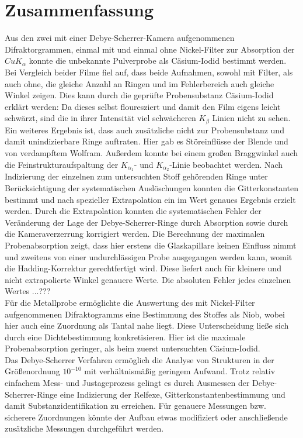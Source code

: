 \documentclass[a4paper,twoside,final]{article}
\begin{document}
\section{Zusammenfassung}
Aus den zwei mit einer Debye-Scherrer-Kamera aufgenommenen Difraktorgrammen, einmal mit und einmal ohne Nickel-Filter zur Absorption der $CuK_{\alpha}$ konnte die unbekannte Pulverprobe als Cäsium-Iodid bestimmt werden. \\
Bei Vergleich beider Filme fiel auf, dass beide Aufnahmen, sowohl mit Filter, als auch ohne, die gleiche Anzahl an Ringen und im Fehlerbereich auch gleiche Winkel zeigen. Dies kann durch die geprüfte Probensubstanz Cäsium-Iodid erklärt werden: Da dieses selbst flouresziert und damit den Film eigens leicht schwärzt, sind die in ihrer Intensität viel schwächeren $K_\beta$ Linien nicht zu sehen. Ein weiteres Ergebnis ist, dass auch zusätzliche nicht zur Probensubstanz und damit unindizierbare Ringe auftraten. Hier gab es Störeinflüsse der Blende und von verdampftem Wolfram. Außerdem konnte bei einem großen Braggwinkel auch die Feinstrukturaufspaltung der $K_{\alpha_1}$- und $K_{\alpha_2}$-Linie beobachtet werden.
Nach Indizierung der einzelnen zum untersuchten Stoff gehörenden Ringe unter Berücksichtigung der systematischen Auslöschungen konnten die Gitterkonstanten bestimmt und nach spezieller Extrapolation ein im Wert genaues Ergebnis erzielt werden. Durch die Extrapolation konnten die systematischen Fehler der Veränderung der Lage der Debye-Scherrer-Ringe durch Absorption sowie durch die Kameraverzerrung korrigiert werden. Die Berechnung der maximalen Probenabsorption zeigt, dass hier erstens die Glaskapillare keinen Einfluss nimmt und zweitens von einer undurchlässigen Probe ausgegangen werden kann, womit die Hadding-Korrektur gerechtfertigt wird. Diese liefert auch für kleinere und nicht extrapolierte Winkel genauere Werte. Die absoluten Fehler jedes einzelnen Wertes ...???\\
Für die Metallprobe ermöglichte die Auswertung des mit Nickel-Filter aufgenommenen Difraktogramms eine Bestimmung des Stoffes als Niob, wobei hier auch eine Zuordnung als Tantal nahe liegt. Diese Unterscheidung ließe sich durch eine Dichtebestimmung konkretisieren. Hier ist die maximale Probenabsorption geringer, als beim zuerst untersuchten Cäsium-Iodid.\\
Das Debye-Scherrer Verfahren ermöglich die Analyse von Strukturen in der Größenordnung $10^{-10}$ mit verhältnismäßig geringem Aufwand. Trotz relativ einfachem Mess- und Justageprozess gelingt es durch Ausmessen der Debye-Scherrer-Ringe eine Indizierung der Relfexe, Gitterkonstantenbestimmung und damit Substanzidentifikation zu erreichen. Für genauere Messungen bzw. sicherere Zuordnungen könnte der Aufbau etwas modifiziert oder anschließende zusätzliche Messungen durchgeführt werden.
\end{document}
